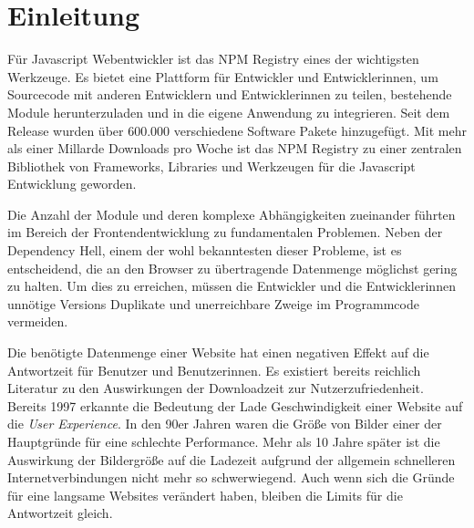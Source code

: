 \section{Einleitung}

Für Javascript Webentwickler ist das NPM Registry eines der wichtigsten Werkzeuge. Es bietet eine Plattform für Entwickler und Entwicklerinnen, um Sourcecode mit anderen Entwicklern und Entwicklerinnen zu teilen, bestehende Module herunterzuladen und in die eigene Anwendung zu integrieren. Seit dem Release wurden über 600.000 verschiedene Software Pakete hinzugefügt. Mit mehr als einer Millarde Downloads pro Woche ist das NPM Registry zu einer zentralen Bibliothek von Frameworks, Libraries und Werkzeugen für die Javascript Entwicklung geworden. \autocite{NpmDocs}

Die Anzahl der Module und deren komplexe Abhängigkeiten zueinander führten im Bereich der Frontendentwicklung zu fundamentalen Problemen. Neben der Dependency Hell, einem der wohl bekanntesten dieser Probleme, ist es entscheidend, die an den Browser zu übertragende Datenmenge möglichst gering zu halten. Um dies zu erreichen, müssen die Entwickler und die Entwicklerinnen unnötige Versions Duplikate und unerreichbare Zweige im Programmcode vermeiden.\autocite{DominikWilkowski}

Die benötigte Datenmenge einer Website hat einen negativen Effekt auf die Antwortzeit für Benutzer und Benutzerinnen. Es existiert bereits reichlich Literatur zu den Auswirkungen der Downloadzeit zur Nutzerzufriedenheit. Bereits 1997 erkannte \textcite{Nielson1997} die Bedeutung der Lade Geschwindigkeit einer Website auf die \textit{User Experience}. In den 90er Jahren waren die Größe von Bilder einer der Hauptgründe für eine schlechte Performance. Mehr als 10 Jahre später ist die Auswirkung der Bildergröße auf die Ladezeit aufgrund der allgemein schnelleren Internetverbindungen nicht mehr so schwerwiegend. Auch wenn sich die Gründe für eine langsame Websites verändert haben, bleiben die Limits für die Antwortzeit gleich. \autocite{Nielson2010}


